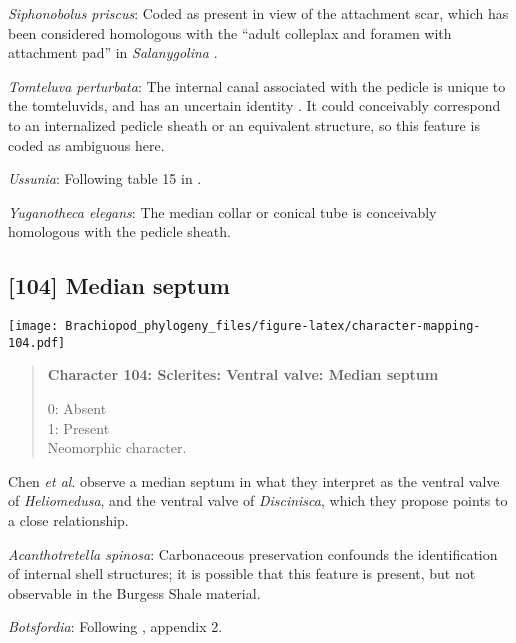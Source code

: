 \documentclass[openany]{book}
\theoremstyle{definition}
\theoremstyle{definition}
\theoremstyle{definition}
\theoremstyle{remark}
\begin{document}
\hypertarget{Siphonobolus_priscus-coding-103}{}
\emph{Siphonobolus priscus}: Coded as present in view of the attachment
scar, which has been considered homologous with the ``adult colleplax
and foramen with attachment pad'' in \emph{Salanygolina}
\citep{Popov2009Earlyontogeny}.

\hypertarget{Tomteluva_perturbata-coding-103}{}
\emph{Tomteluva perturbata}: The internal canal associated with the
pedicle is unique to the tomteluvids, and has an uncertain identity
\citep{Streng2016Anew}. It could conceivably correspond to an
internalized pedicle sheath or an equivalent structure, so this feature
is coded as ambiguous here.

\hypertarget{Ussunia-coding-103}{}
\emph{Ussunia}: Following table 15 in
\citet{Williams2000LinguliformeaCraniiformea}.

\hypertarget{Yuganotheca_elegans-coding-103}{}
\emph{Yuganotheca elegans}: The median collar or conical tube is
conceivably homologous with the pedicle sheath.

\subsection*{{[}104{]} Median septum}\label{median-septum}

\texttt{[image: Brachiopod\_phylogeny\_files/figure-latex/character-mapping-104.pdf]}

\begin{quote}
\textbf{Character 104: Sclerites: Ventral valve: Median septum}

0: Absent\\
1: Present\\
Neomorphic character.
\end{quote}

Chen \emph{et al}. \citeyearpar{Chen2007Reinterpretationof} observe a
median septum in what they interpret as the ventral valve of
\emph{Heliomedusa}, and the ventral valve of \emph{Discinisca}, which
they propose points to a close relationship.

\hypertarget{Acanthotretella_spinosa-coding-104}{}
\emph{Acanthotretella spinosa}: Carbonaceous preservation confounds the
identification of internal shell structures; it is possible that this
feature is present, but not observable in the Burgess Shale material.

\hypertarget{Botsfordia-coding-104}{}
\emph{Botsfordia}: Following \citet{Williams1998Thediversity}, appendix
2.
\end{document}

